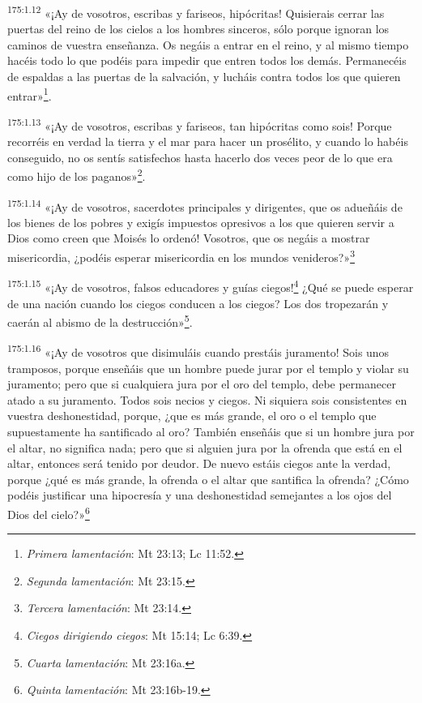 \par 
\textsuperscript{175:1.12} «¡Ay de vosotros, escribas y fariseos, hipócritas! Quisierais cerrar las puertas del reino de los cielos a los hombres sinceros, sólo porque ignoran los caminos de vuestra enseñanza. Os negáis a entrar en el reino, y al mismo tiempo hacéis todo lo que podéis para impedir que entren todos los demás. Permanecéis de espaldas a las puertas de la salvación, y lucháis contra todos los que quieren entrar»\footnote{\textit{Primera lamentación}: Mt 23:13; Lc 11:52.}.

\par 
\textsuperscript{175:1.13} «¡Ay de vosotros, escribas y fariseos, tan hipócritas como sois! Porque recorréis en verdad la tierra y el mar para hacer un prosélito, y cuando lo habéis conseguido, no os sentís satisfechos hasta hacerlo dos veces peor de lo que era como hijo de los paganos»\footnote{\textit{Segunda lamentación}: Mt 23:15.}.

\par 
\textsuperscript{175:1.14} «¡Ay de vosotros, sacerdotes principales y dirigentes, que os adueñáis de los bienes de los pobres y exigís impuestos opresivos a los que quieren servir a Dios como creen que Moisés lo ordenó! Vosotros, que os negáis a mostrar misericordia, ¿podéis esperar misericordia en los mundos venideros?»\footnote{\textit{Tercera lamentación}: Mt 23:14.}

\par 
\textsuperscript{175:1.15} «¡Ay de vosotros, falsos educadores y guías ciegos!\footnote{\textit{Ciegos dirigiendo ciegos}: Mt 15:14; Lc 6:39.} ¿Qué se puede esperar de una nación cuando los ciegos conducen a los ciegos? Los dos tropezarán y caerán al abismo de la destrucción»\footnote{\textit{Cuarta lamentación}: Mt 23:16a.}.

\par 
\textsuperscript{175:1.16} «¡Ay de vosotros que disimuláis cuando prestáis juramento! Sois unos tramposos, porque enseñáis que un hombre puede jurar por el templo y violar su juramento; pero que si cualquiera jura por el oro del templo, debe permanecer atado a su juramento. Todos sois necios y ciegos. Ni siquiera sois consistentes en vuestra deshonestidad, porque, ¿que es más grande, el oro o el templo que supuestamente ha santificado al oro? También enseñáis que si un hombre jura por el altar, no significa nada; pero que si alguien jura por la ofrenda que está en el altar, entonces será tenido por deudor. De nuevo estáis ciegos ante la verdad, porque ¿qué es más grande, la ofrenda o el altar que santifica la ofrenda? ¿Cómo podéis justificar una hipocresía y una deshonestidad semejantes a los ojos del Dios del cielo?»\footnote{\textit{Quinta lamentación}: Mt 23:16b-19.}

